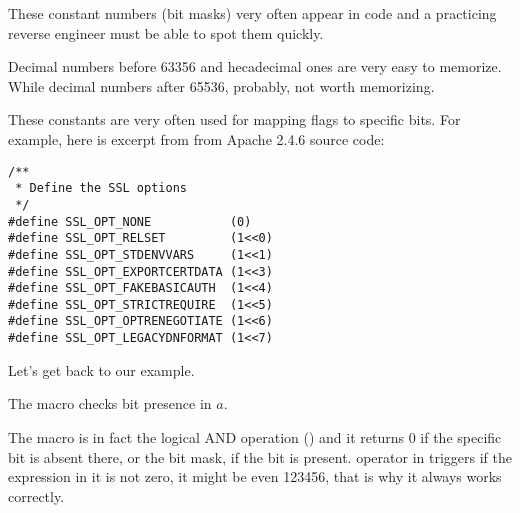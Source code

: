 These constant numbers (bit masks) very often appear in code and a practicing reverse engineer 
must be able to spot them quickly.

Decimal numbers before 63356 and hecadecimal ones are very easy to memorize.
While decimal numbers after 65536, probably, not worth memorizing.

These constants are very often used for mapping flags to specific bits.
For example, here is excerpt from  
from Apache 2.4.6 source code:

\begin{lstlisting}[style=customc]
/**
 * Define the SSL options
 */
#define SSL_OPT_NONE           (0)
#define SSL_OPT_RELSET         (1<<0)
#define SSL_OPT_STDENVVARS     (1<<1)
#define SSL_OPT_EXPORTCERTDATA (1<<3)
#define SSL_OPT_FAKEBASICAUTH  (1<<4)
#define SSL_OPT_STRICTREQUIRE  (1<<5)
#define SSL_OPT_OPTRENEGOTIATE (1<<6)
#define SSL_OPT_LEGACYDNFORMAT (1<<7)
\end{lstlisting}

Let's get back to our example.

The  macro checks bit presence in $a$.

The  macro is in fact the logical AND operation () 
and it returns 0 if the specific bit is absent there,
or the bit mask, if the bit is present.
 operator in \CCpp triggers if the expression in it is not zero, it might be even 123456, that is why
it always works correctly.





